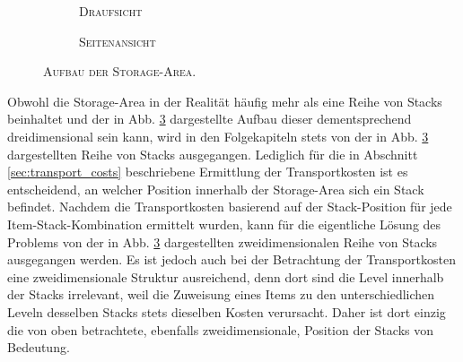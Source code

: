 \begin{figure}[H]
\centering

\begin{subfigure}[b]{\textwidth}
\centering
{}
\caption{\textsc{Draufsicht}}
\label{fig:topview}
\end{subfigure}
\par\bigskip
\begin{subfigure}[b]{\textwidth}
\centering
{}
\caption{\textsc{Seitenansicht}}
\label{fig:sideview}
\end{subfigure}

\caption{\textsc{Aufbau der Storage-Area}.}
\label{fig:storage_area}
\end{figure}

\pagebreak

Obwohl die Storage-Area in der Realität häufig mehr als eine Reihe von Stacks beinhaltet und der in
Abb. \ref{fig:storage_area} dargestellte Aufbau dieser dementsprechend dreidimensional sein kann,
wird in den Folgekapiteln stets von der in Abb. \ref{fig:storage_area} dargestellten Reihe von Stacks ausgegangen.
Lediglich für die in Abschnitt \ref{sec:transport_costs} beschriebene Ermittlung der Transportkosten ist es entscheidend,
an welcher Position innerhalb der Storage-Area sich ein Stack befindet. Nachdem die Transportkosten basierend auf der
Stack-Position für jede Item-Stack-Kombination ermittelt wurden, kann für die eigentliche Lösung des Problems von
der in Abb. \ref{fig:storage_area} dargestellten zweidimensionalen Reihe von Stacks ausgegangen werden.
Es ist jedoch auch bei der Betrachtung der Transportkosten eine zweidimensionale Struktur ausreichend, denn dort sind
die Level innerhalb der Stacks irrelevant, weil die Zuweisung eines Items zu den unterschiedlichen Leveln
desselben Stacks stets dieselben Kosten verursacht. Daher ist dort einzig die von oben betrachtete, ebenfalls zweidimensionale,
Position der Stacks von Bedeutung.

